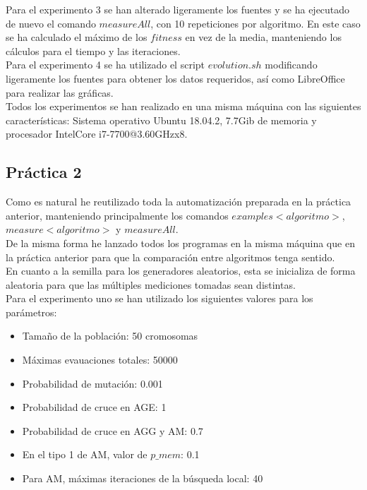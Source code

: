\documentclass[11pt,a4paper]{article}
\begin{document}
	Para el experimento 3 se han alterado ligeramente los fuentes y se ha ejecutado de nuevo el comando $measureAll$, con 10 repeticiones por algoritmo. En este caso se ha calculado el máximo de los $fitness$ en vez de la media, manteniendo los cálculos para el tiempo y las iteraciones. \\
	
	Para el experimento 4 se ha utilizado el script $evolution.sh$ modificando ligeramente los fuentes para obtener los datos requeridos, así como LibreOffice para realizar las gráficas. \\
	
	Todos los experimentos se han realizado en una misma máquina con las siguientes características: Sistema operativo Ubuntu 18.04.2, 7.7Gib de memoria y procesador IntelCore i7-7700@3.60GHzx8.
	

	\subsection{ Práctica 2 } \label{procedimiento2}
	
	Como es natural he reutilizado toda la automatización preparada en la práctica anterior, manteniendo principalmente los comandos $examples<algoritmo>$, $measure<algoritmo>$ y $measureAll$. \\
	
	De la misma forma he lanzado todos los programas en la misma máquina que en la práctica anterior para que la comparación entre algoritmos tenga sentido. \\
	
	En cuanto a la semilla para los generadores aleatorios, esta se inicializa de forma aleatoria para que las múltiples mediciones tomadas sean distintas. \\
	
	Para el experimento uno se han utilizado los siguientes valores para los parámetros:
	
	\begin{itemize}
		\item Tamaño de la población: 50 cromosomas
		\item Máximas evauaciones totales: 50000
		\item Probabilidad de mutación: 0.001
		\item Probabilidad de cruce en AGE: 1
		\item Probabilidad de cruce en AGG y AM: 0.7
		\item En el tipo 1 de AM, valor de $p\_mem$: 0.1
		\item Para AM, máximas iteraciones de la búsqueda local: 40
	\end{itemize}
\end{document}
